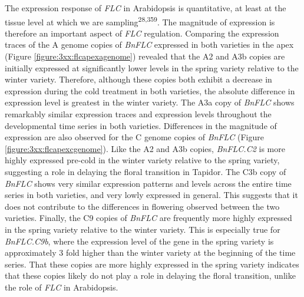 \documentclass[12pt,]{book}
\begin{document}
The expression response of \emph{FLC} in Arabidopsis is quantitative, at
least at the tissue level at which we are
sampling\textsuperscript{28,359}. The magnitude of expression is
therefore an important aspect of \emph{FLC} regulation. Comparing the
expression traces of the A genome copies of \emph{BnFLC} expressed in
both varieties in the apex (Figure \ref{figure:3xx:flcapexagenome})
revealed that the A2 and A3b copies are initially expressed at
significantly lower levels in the spring variety relative to the winter
variety. Therefore, although these copies both exhibit a decrease in
expression during the cold treatment in both varieties, the absolute
difference in expression level is greatest in the winter variety. The
A3a copy of \emph{BnFLC} shows remarkably similar expression traces and
expression levels throughout the developmental time series in both
varieties. Differences in the magnitude of expression are also observed
for the C genome copies of \emph{BnFLC} (Figure
\ref{figure:3xx:flcapexcgenome}). Like the A2 and A3b copies,
\emph{BnFLC.C2} is more highly expressed pre-cold in the winter variety
relative to the spring variety, suggesting a role in delaying the floral
transition in Tapidor. The C3b copy of \emph{BnFLC} shows very similar
expression patterns and levels across the entire time series in both
varieties, and very lowly expressed in general. This suggests that it
does not contribute to the differences in flowering observed between the
two varieties. Finally, the C9 copies of \emph{BnFLC} are frequently
more highly expressed in the spring variety relative to the winter
variety. This is especially true for \emph{BnFLC.C9b}, where the
expression level of the gene in the spring variety is approximately 3
fold higher than the winter variety at the beginning of the time series.
That these copies are more highly expressed in the spring variety
indicates that these copies likely do not play a role in delaying the
floral transition, unlike the role of \emph{FLC} in Arabidopsis.
\end{document}
